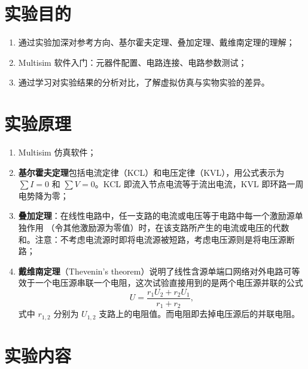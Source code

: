 \documentclass[12pt]{SEU-Circuit-Report}
\begin{document}
    \exptitlepage

    \section{实验目的}
        \begin{enumerate}
            \item 通过实验加深对参考方向、基尔霍夫定理、叠加定理、戴维南定理的理解； 
            \item Multisim 软件入门：元器件配置、电路连接、电路参数测试； 
            \item 通过学习对实验结果的分析对比，了解虚拟仿真与实物实验的差异。
        \end{enumerate}

    \section{实验原理}
        \begin{enumerate}
            \item Multisim 仿真软件；
            \item \textbf{基尔霍夫定理}包括电流定律（KCL）和电压定律（KVL），用公式表示为 $\sum I=0$ 和 $\sum V=0$。KCL 即流入节点电流等于流出电流，KVL 即环路一周电势降为零；
            \item \textbf{叠加定理}：在线性电路中，任一支路的电流或电压等于电路中每一个激励源单独作用 （令其他激励源为零值）时，在该支路所产生的电流或电压的代数和。注意：不考虑电流源时即将电流源被短路，考虑电压源则是将电压源断路；
            \item \textbf{戴维南定理}（Thevenin's theorem）说明了线性含源单端口网络对外电路可等效于一个电压源串联一个电阻\cite{circuit_book}，这次试验直接用到的是两个电压源并联的公式
            \begin{equation}\label{eq:thevenin}
                U=\frac{r_1U_2+r_2U_1}{r_1+r_2},
            \end{equation}
            式中 $r_{1,2}$ 分别为 $U_{1,2}$ 支路上的电阻值。而电阻即去掉电压源后的并联电阻。
        \end{enumerate}

    \section{实验内容}
\end{document}
